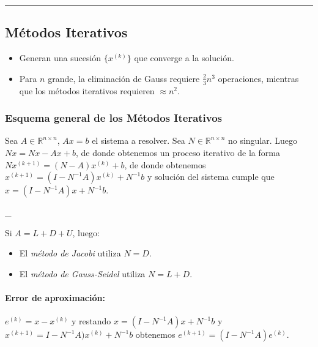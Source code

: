 \begin{center}\rule{0.5\linewidth}{\linethickness}\end{center}

\hypertarget{muxe9todos-iterativos}{%
\subsection{Métodos Iterativos}\label{muxe9todos-iterativos}}

\begin{itemize}
\tightlist
\item
  Generan una sucesión \(\{x^{(k)}\}\) que converge a la solución.
\item
  Para \(n\) grande, la eliminación de Gauss requiere \(\frac{2}{3}n^3\)
  operaciones, mientras que los métodos iterativos requieren
  \(\approx n^2\).
\end{itemize}

\hypertarget{esquema-general-de-los-muxe9todos-iterativos}{%
\subsubsection{Esquema general de los Métodos
Iterativos}\label{esquema-general-de-los-muxe9todos-iterativos}}

Sea \(A \in \ensuremath{\mathbb{R}}^{n \times n}\), \(Ax = b\) el
sistema a resolver. Sea \(N \in \ensuremath{\mathbb{R}}^{n \times n}\)
no singular. Luego \(N x = N x - A x + b\), de donde obtenemos un
proceso iterativo de la forma \(N x^{(k+1)} = (N - A) x^{(k)} + b\), de
donde obtenemos \(x^{(k+1)} = (I - N^{-1} A) x^{(k)} + N^{-1} b\) y
solución del sistema cumple que \(x = (I - N^{-1} A) x + N^{-1} b\).

\_

Si \(A = L + D + U\), luego:

\begin{itemize}
\tightlist
\item
  El \emph{método de Jacobi} utiliza \(N = D\).
\item
  El \emph{método de Gauss-Seidel} utiliza \(N = L + D\).
\end{itemize}

\hypertarget{error-de-aproximaciuxf3n}{%
\paragraph{Error de aproximación:}\label{error-de-aproximaciuxf3n}}

\(e^{(k)} = x - x^{(k)}\) y restando \(x = (I - N^{-1} A) x + N^{-1} b\)
y \(x^{(k+1)} = I - N^{-1} A) x^{(k)} + N^{-1} b\) obtenemos
\(e^{(k+1)} = (I - N^{-1} A) e^{(k)}\).

